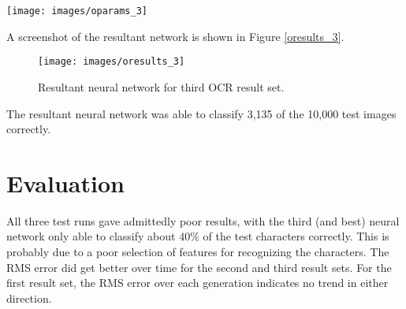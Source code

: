 \begin{center}
\texttt{[image: images/oparams\_3]}
\end{center}

A screenshot of the resultant network is shown in Figure \ref{oresults_3}.

\begin{figure}[hbt!]
  \centering
  \texttt{[image: images/oresults\_3]}
  \caption{Resultant neural network for third OCR result set.}
  \label{oresults_2}
\end{figure}

The resultant neural network was able to classify 3,135 of the 10,000
test images correctly.

\section{Evaluation}
All three test runs gave admittedly poor results, with the third (and
best) neural network only able to classify about $40\%$ of the test
characters correctly.
This is probably due to a poor selection of features for recognizing
the characters.
The RMS error did get better over time for the second and third result
sets.
For the first result set, the RMS error over each generation indicates
no trend in either direction.
